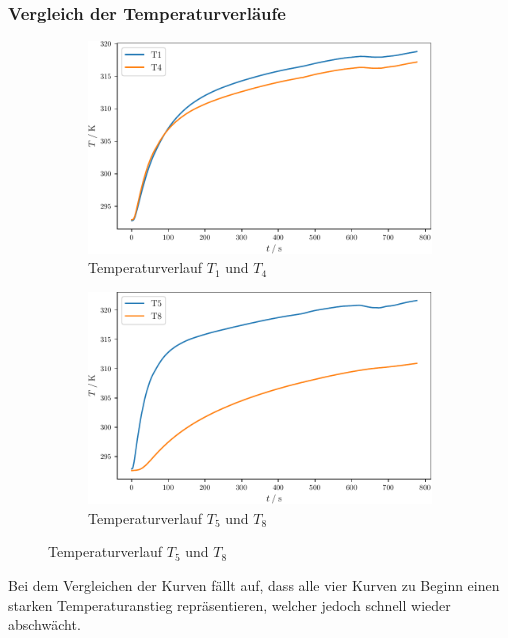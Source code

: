 \subsubsection{Vergleich der Temperaturverläufe}
\begin{figure}
  \caption{Tempereaturverläufe der statischen Methode}
  \label{fig:stat2}
  \begin{subfigure}{0.48\textwidth}
    \centering
    \includegraphics[width = \textwidth]{build/stat14.pdf}
    \caption{Temperaturverlauf $T_1$ und $T_4$}
    \label{fig:stat14}
  \end{subfigure}
  \begin{subfigure}{0.48\textwidth}
    \centering
    \includegraphics[width = \textwidth]{build/stat58.pdf}
    \caption{Temperaturverlauf $T_5$ und $T_8$}
    \label{fig:stat58}
  \end{subfigure}
\end{figure}
Bei dem Vergleichen der Kurven fällt auf, dass alle vier Kurven zu Beginn einen starken Temperaturanstieg repräsentieren, welcher jedoch schnell wieder abschwächt.
